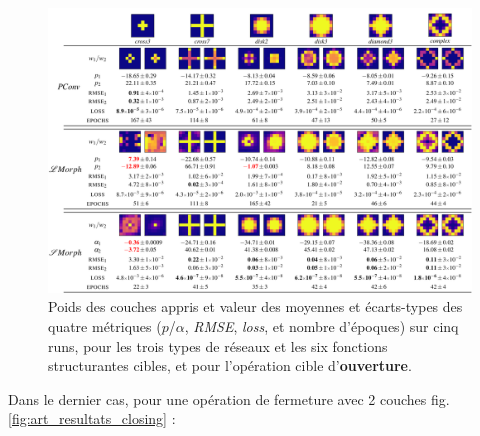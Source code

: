 \vspace{-4mm}
\begin{figure}[ht]
  \begin{center}
    \includegraphics[width=1.00\textwidth]{parts/2-etat_de_lart/D-efficacite_des_reseaux_existant/figures/art_opening.png}
    \vspace{-4.0mm}
    \caption{ \centering Poids des couches appris et valeur des moyennes et écarts-types des quatre métriques ($p$/$\alpha$, \textit{RMSE}, \textit{loss}, et nombre d'époques) sur cinq runs, pour les trois types de réseaux et les six fonctions structurantes cibles, et pour l'opération cible d'\textbf{ouverture}.}
    \label{fig:art_resultats_opening}
  \end{center}
\end{figure}


\newpage

Dans le dernier cas, pour une opération de fermeture avec 2 couches fig. \ref{fig:art_resultats_closing} : \\

